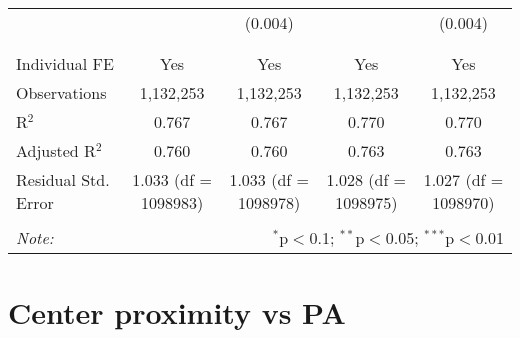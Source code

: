 \documentclass[
]{article}
\begin{document}
\begin{table}[!htbp]
{\begin{tabular}{@{\extracolsep{5pt}}lcccc}
  &  & (0.004) &  & (0.004) \\ 
  & & & & \\ 
\hline \\[-1.8ex] 
Individual FE & Yes & Yes & Yes & Yes \\ 
Observations & 1,132,253 & 1,132,253 & 1,132,253 & 1,132,253 \\ 
R$^{2}$ & 0.767 & 0.767 & 0.770 & 0.770 \\ 
Adjusted R$^{2}$ & 0.760 & 0.760 & 0.763 & 0.763 \\ 
Residual Std. Error & 1.033 (df = 1098983) & 1.033 (df = 1098978) & 1.028 (df = 1098975) & 1.027 (df = 1098970) \\ 
\hline 
\hline \\[-1.8ex] 
\textit{Note:}  & \multicolumn{4}{r}{$^{*}$p$<$0.1; $^{**}$p$<$0.05; $^{***}$p$<$0.01} \\ 
\end{tabular}
} 
\end{table} 
\newpage
\section{Center proximity vs PA}
\end{document}
